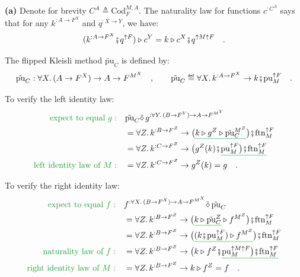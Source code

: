 \textbf{(a)} Denote for brevity $C^{A}\triangleq\text{Cod}_{F}^{M,A}$.
The naturality law for functions $c^{:C^{A}}$ says that for any $k^{:A\rightarrow F^{X}}$
and $q^{:X\rightarrow Y}$, we have:
\[
(k^{:A\rightarrow F^{X}}\bef q^{\uparrow F})\triangleright c^{Y}=k\triangleright c^{X}\bef q^{\uparrow M\uparrow F}\quad.
\]

The flipped Kleisli method $\tilde{\text{pu}}_{C}$ is defined by:
\[
\tilde{\text{pu}}_{C}:\forall X.\,(A\rightarrow F^{X})\rightarrow A\rightarrow F^{M^{X}}\quad,\quad\quad\tilde{\text{pu}}_{C}\triangleq\forall X.\,k^{:A\rightarrow F^{X}}\rightarrow k\bef\text{pu}_{M}^{\uparrow F}\quad.
\]

To verify the left identity law:
\begin{align*}
{\color{greenunder}\text{expect to equal }g:}\quad & \tilde{\text{pu}}_{C}\tilde{\diamond}\,g^{:\forall Y.\,(B\rightarrow F^{Y})\rightarrow A\rightarrow F^{M^{Y}}}\\
 & =\forall Z.\,k^{:B\rightarrow F^{Z}}\rightarrow\big(\gunderline{k\triangleright g^{Z}\triangleright\tilde{\text{pu}}_{C}^{M^{Z}}}\big)\bef\text{ftn}_{M}^{\uparrow F}\\
 & =\forall Z.\,k^{:C\rightarrow F^{Z}}\rightarrow\big(g^{Z}(k)\bef\gunderline{\text{pu}_{M}^{\uparrow F}\big)\bef\text{ftn}_{M}^{\uparrow F}}\\
{\color{greenunder}\text{left identity law of }M:}\quad & =\forall Z.\,k^{:C\rightarrow F^{Z}}\rightarrow g^{Z}(k)=g\quad.
\end{align*}

To verify the right identity law:
\begin{align*}
{\color{greenunder}\text{expect to equal }f:}\quad & f^{:\forall X.\,(B\rightarrow F^{X})\rightarrow A\rightarrow F^{M^{X}}}\tilde{\diamond}\,\tilde{\text{pu}}_{C}\\
 & =\forall Z.\,k^{:B\rightarrow F^{Z}}\rightarrow\big(\gunderline{k\triangleright\tilde{\text{pu}}_{C}^{Z}}\triangleright f^{M^{Z}}\big)\bef\text{ftn}_{M}^{\uparrow F}\\
 & =\forall Z.\,k^{:B\rightarrow F^{Z}}\rightarrow\big(\gunderline{(k\bef\text{pu}_{M}^{\uparrow F})\triangleright f^{M^{Z}}}\big)\bef\text{ftn}_{M}^{\uparrow F}\\
{\color{greenunder}\text{naturality law of }f:}\quad & =\forall Z.\,k^{:B\rightarrow F^{Z}}\rightarrow\big(k\triangleright f^{Z}\bef\gunderline{\text{pu}_{M}^{\uparrow M\uparrow F}\big)\bef\text{ftn}_{M}^{\uparrow F}}\\
{\color{greenunder}\text{right identity law of }M:}\quad & =\forall Z.\,k^{:B\rightarrow F^{Z}}\rightarrow k\triangleright f^{Z}=f\quad.
\end{align*}


